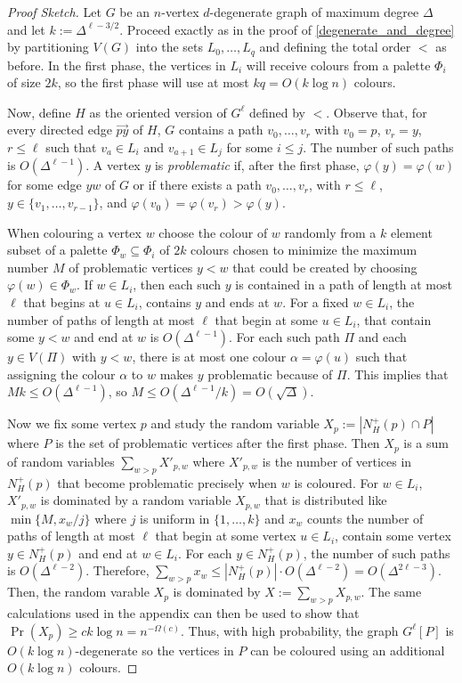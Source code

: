 \documentclass{patmorin}
\newcommand{\defin}[1]{\emph{\color{brightmaroon}#1}}
\begin{document}
\begin{proof}[Proof Sketch]
  Let $G$ be an $n$-vertex $d$-degenerate graph of maximum degree $\Delta$ and let $k:=\Delta^{\ell-3/2}$. Proceed exactly as in the proof of \cref{degenerate_and_degree} by partitioning $V(G)$ into the sets $L_0,\ldots,L_q$ and defining the total order $<$ as before.  In the first phase, the vertices in $L_i$ will receive colours from a palette $\Phi_i$ of size $2k$, so the first phase will use at most $kq=O(k\log n)$ colours.

  Now, define $H$ as the oriented version of $G^{\ell}$ defined by $<$.  Observe that, for every directed edge $\overrightarrow{py}$ of $H$, $G$ contains a path $v_0,\ldots,v_r$ with $v_0=p$, $v_r=y$, $r\le \ell$ such that $v_a\in L_i$ and $v_{a+1}\in L_j$ for some $i\le j$.  The number of such paths is $O(\Delta^{\ell-1})$. A vertex $y$ is \defin{problematic} if, after the first phase, $\varphi(y)=\varphi(w)$ for some edge $yw$ of $G$ or if there exists a path $v_0,\ldots,v_r$, with $r\le \ell$, $y\in\{v_1,\ldots,v_{r-1}\}$, and $\varphi(v_0)=\varphi(v_r) > \varphi(y)$.

  When colouring a vertex $w$ choose the colour of $w$ randomly from a $k$ element subset of a palette $\Phi_w\subseteq \Phi_i$ of $2k$ colours chosen to minimize the maximum number $M$ of problematic vertices $y<w$ that could be created by choosing $\varphi(w)\in \Phi_w$.  If $w\in L_i$, then each such $y$ is contained in a path of length at most $\ell$ that begins at $u\in L_i$, contains $y$ and ends at $w$.  For a fixed $w\in L_i$, the number of paths of length at most $\ell$ that begin at some $u\in L_i$, that contain some $y<w$ and end at $w$ is $O(\Delta^{\ell-1})$. For each such path $\Pi$ and each $y\in V(\Pi)$ with $y < w$, there is at most one colour $\alpha=\varphi(u)$ such that assigning the colour $\alpha$ to $w$ makes $y$ problematic because of $\Pi$.  This implies that $Mk \le O(\Delta^{\ell-1})$, so $M\le O(\Delta^{\ell-1}/k)=O(\sqrt{\Delta})$.

  Now we fix some vertex $p$ and study the random variable $X_p:=|N^+_H(p)\cap P|$ where $P$ is the set of problematic vertices after the first phase.  Then $X_p$ is a sum of random variables $\sum_{w>p} X'_{p,w}$ where $X'_{p,w}$ is the number of vertices in $N^+_H(p)$ that become problematic precisely when $w$ is coloured.  For $w\in L_i$, $X'_{p,w}$ is dominated by a random variable $X_{p,w}$ that is distributed like $\min\{M,x_w/j\}$ where $j$ is uniform in $\{1,\ldots,k\}$ and $x_w$ counts the number of paths of length at most $\ell$ that begin at some vertex $u\in L_i$, contain some vertex $y\in N^+_H(p)$ and end at $w\in L_i$.  For each $y\in N^+_H(p)$, the number of such paths is $O(\Delta^{\ell-2})$.  Therefore, $\sum_{w>p} x_w\le |N^+_H(p)|\cdot O(\Delta^{\ell-2})=O(\Delta^{2\ell-3})$.  Then, the random varable $X_p$ is dominated by $X:=\sum_{w>p} X_{p,w}$. The same calculations  used in the appendix can then be used to show that $\Pr(X_p)\ge ck\log n=n^{-\Omega(c)}$.  Thus, with high probability, the graph $G^{\ell}[P]$ is $O(k\log n)$-degenerate so the vertices in $P$ can be coloured using an additional $O(k\log n)$ colours.
\end{proof}
\end{document}
